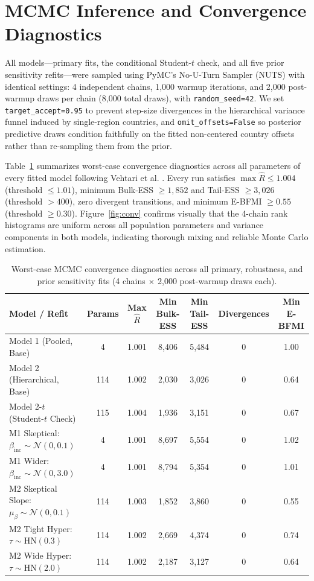 \documentclass[11pt,a4paper]{article}
\begin{document}
\section{MCMC Inference and Convergence Diagnostics}

All models---primary fits, the conditional Student-$t$ check, and all five prior sensitivity refits---were sampled using PyMC's No-U-Turn Sampler (NUTS) with identical settings: 4 independent chains, 1,000 warmup iterations, and 2,000 post-warmup draws per chain (8,000 total draws), with \texttt{random\_seed=42}. We set \texttt{target\_accept=0.95} to prevent step-size divergences in the hierarchical variance funnel induced by single-region countries, and \texttt{omit\_offsets=False} so posterior predictive draws condition faithfully on the fitted non-centered country offsets rather than re-sampling them from the prior.

Table~\ref{tab:convergence} summarizes worst-case convergence diagnostics across all parameters of every fitted model following Vehtari et al. \cite{vehtari2021rank}. Every run satisfies $\max\hat{R} \le 1.004$ (threshold $\le 1.01$), minimum Bulk-ESS $\ge 1{,}852$ and Tail-ESS $\ge 3{,}026$ (threshold $> 400$), zero divergent transitions, and minimum E-BFMI $\ge 0.55$ (threshold $\ge 0.30$). Figure~\ref{fig:conv} confirms visually that the 4-chain rank histograms are uniform across all population parameters and variance components in both models, indicating thorough mixing and reliable Monte Carlo estimation.

\begin{table}[H]
\centering
\caption{Worst-case MCMC convergence diagnostics across all primary, robustness, and prior sensitivity fits (4 chains $\times$ 2,000 post-warmup draws each).}
\label{tab:convergence}
\begin{tabular}{lcccccc}
\toprule
Model / Refit & Params & Max $\hat{R}$ & Min Bulk-ESS & Min Tail-ESS & Divergences & Min E-BFMI \\
\midrule
Model 1 (Pooled, Base) & 4 & 1.001 & 8,406 & 5,484 & 0 & 1.00 \\
Model 2 (Hierarchical, Base) & 114 & 1.002 & 2,030 & 3,026 & 0 & 0.64 \\
Model 2-$t$ (Student-$t$ Check) & 115 & 1.004 & 1,936 & 3,151 & 0 & 0.67 \\
\midrule
M1 Skeptical: $\beta_{\text{inc}} \sim \mathcal{N}(0, 0.1)$ & 4 & 1.001 & 8,697 & 5,554 & 0 & 1.02 \\
M1 Wider: $\beta_{\text{inc}} \sim \mathcal{N}(0, 3.0)$ & 4 & 1.001 & 8,794 & 5,354 & 0 & 1.01 \\
M2 Skeptical Slope: $\mu_\beta \sim \mathcal{N}(0, 0.1)$ & 114 & 1.003 & 1,852 & 3,860 & 0 & 0.55 \\
M2 Tight Hyper: $\tau \sim \text{HN}(0.3)$ & 114 & 1.002 & 2,669 & 4,374 & 0 & 0.74 \\
M2 Wide Hyper: $\tau \sim \text{HN}(2.0)$ & 114 & 1.002 & 2,187 & 3,127 & 0 & 0.64 \\
\bottomrule
\end{tabular}
\end{table}
\end{document}

